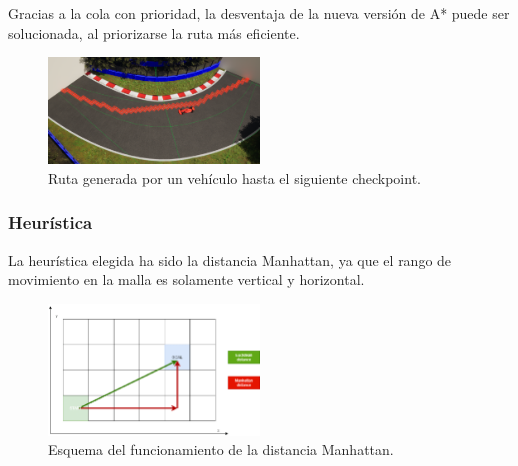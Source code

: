 \bigskip

Gracias a la cola con prioridad, la desventaja de la nueva versión de A* puede ser solucionada, al priorizarse la ruta más eficiente.


\begin{figure}[H]
    \centering
    \includegraphics[width=0.5\textwidth]{imagenes/rutaAStar.png}
    \caption{Ruta generada por un vehículo hasta el siguiente checkpoint.}
    \label{fig:rutaastar}
\end{figure}

\subsubsection{Heurística}




La heurística elegida ha sido la distancia Manhattan, ya que el rango de movimiento en la malla es solamente vertical y horizontal.

\begin{figure}[H]
    \centering
    \includegraphics[width=0.5\textwidth]{imagenes/Euclidean-and-Manhattan-distance-comparison-3235-Optimizations-The-first-optimization.png}
    \caption{Esquema del funcionamiento de la distancia Manhattan\cite{gameai}.}
    \label{fig:manhattan}
\end{figure}


